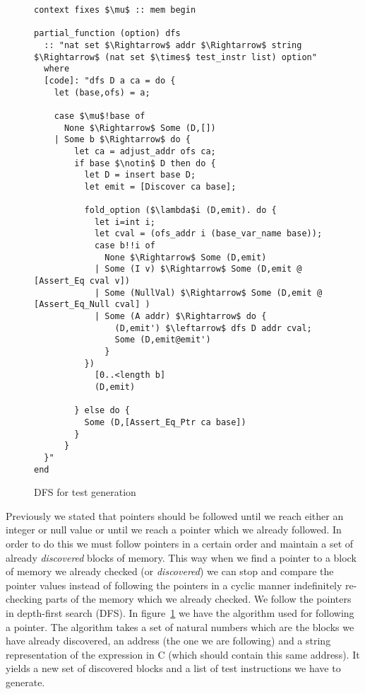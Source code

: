 \begin{figure}
\begin{lstlisting}[mathescape=true]
context fixes $\mu$ :: mem begin

partial_function (option) dfs
  :: "nat set $\Rightarrow$ addr $\Rightarrow$ string $\Rightarrow$ (nat set $\times$ test_instr list) option"
  where
  [code]: "dfs D a ca = do {
    let (base,ofs) = a;

    case $\mu$!base of
      None $\Rightarrow$ Some (D,[])
    | Some b $\Rightarrow$ do {
        let ca = adjust_addr ofs ca;
        if base $\notin$ D then do {
          let D = insert base D;
          let emit = [Discover ca base];

          fold_option ($\lambda$i (D,emit). do {
            let i=int i;
            let cval = (ofs_addr i (base_var_name base));
            case b!!i of
              None $\Rightarrow$ Some (D,emit)
            | Some (I v) $\Rightarrow$ Some (D,emit @ [Assert_Eq cval v])
            | Some (NullVal) $\Rightarrow$ Some (D,emit @ [Assert_Eq_Null cval] )
            | Some (A addr) $\Rightarrow$ do {
                (D,emit') $\leftarrow$ dfs D addr cval;
                Some (D,emit@emit')
              }
          })
            [0..<length b]
            (D,emit)

        } else do {
          Some (D,[Assert_Eq_Ptr ca base])
        }
      }
  }"
end
\end{lstlisting}

\caption{DFS for test generation}
\label{fig:dfs_test}
\end{figure}

Previously we stated that pointers should be followed until we reach either an integer or null value or until we reach a pointer which we already followed.
In order to do this we must follow pointers in a certain order and maintain a set of already \textit{discovered} blocks of memory.
This way when we find a pointer to a block of memory we already checked (or \textit{discovered}) we can stop and compare the pointer values instead of following the pointers in a cyclic manner indefinitely re-checking parts of the memory which we already checked.
We follow the pointers in depth-first search (DFS).
In figure~\ref{fig:dfs_test} we have the algorithm used for following a pointer.
The algorithm takes a set of natural numbers which are the blocks we have already discovered, an address (the one we are following) and a string representation of the expression in C (which should contain this same address).
It yields a new set of discovered blocks and a list of test instructions we have to generate.

